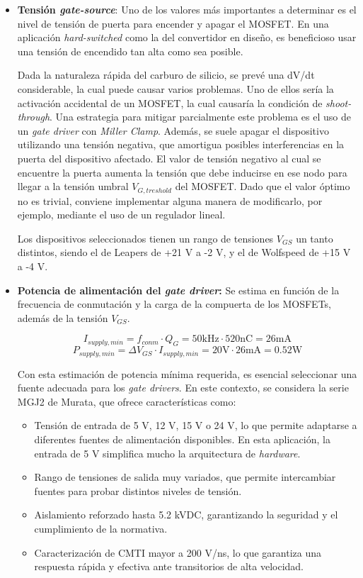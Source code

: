 \begin{itemize}
	
	\item \textbf{Tensión \textit{gate-source}}: Uno de los valores más importantes a determinar es el nivel de tensión de puerta para encender y apagar el MOSFET. En una aplicación \textit{hard-switched} como la del convertidor en diseño, es beneficioso usar una tensión de encendido tan alta como sea posible.
	
	Dada la naturaleza rápida del carburo de silicio, se prevé una dV/dt considerable, la cual puede causar varios problemas. Uno de ellos sería la activación accidental de un MOSFET, la cual causaría la condición de \textit{shoot-through}. Una estrategia para mitigar parcialmente este problema es el uso de un \textit{gate driver} con \textit{Miller Clamp}. Además, se suele apagar el dispositivo utilizando una tensión negativa, que amortigua posibles interferencias en la puerta del dispositivo afectado. El valor de tensión negativo al cual se encuentre la puerta aumenta la tensión que debe inducirse en ese nodo para llegar a la tensión umbral $V_{G,treshold}$ del MOSFET. Dado que el valor óptimo no es trivial, conviene implementar alguna manera de modificarlo, por ejemplo, mediante el uso de un regulador lineal.
	
	Los dispositivos seleccionados tienen un rango de tensiones $V_{GS}$ un tanto distintos, siendo el de Leapers de +21 V a -2 V, y el de Wolfspeed de +15 V a -4 V.
	
	\item \textbf{Potencia de alimentación del \textit{gate driver}:} Se estima en función de la frecuencia de conmutación y la carga de la compuerta de los MOSFETs, además de la tensión $V_{GS}$.
	
	\[
	I_{supply, min} = f_{conm}\cdot Q_G = 50 \text{kHz} \cdot 520 \text{nC} = 26 \text{mA}
	\]
	\[
	P_{supply, min} = \Delta V_{GS}\cdot I_{supply, min} = 20 \text{V} \cdot26 \text{mA} = 0.52 \text{W}
	\]
	
	Con esta estimación de potencia mínima requerida, es esencial seleccionar una fuente adecuada para los \textit{gate drivers}. En este contexto, se considera la serie MGJ2 de Murata, que ofrece características como:
	\begin{itemize}
		\item Tensión de entrada de 5 V, 12 V, 15 V o 24 V, lo que permite adaptarse a diferentes fuentes de alimentación disponibles. En esta aplicación, la entrada de 5 V simplifica mucho la arquitectura de \textit{hardware}.
		\item Rango de tensiones de salida muy variados, que permite intercambiar fuentes para probar distintos niveles de tensión.
		\item Aislamiento reforzado hasta 5.2 kVDC, garantizando la seguridad y el cumplimiento de la normativa.
		\item Caracterización de CMTI mayor a 200 V/ns, lo que garantiza una respuesta rápida y efectiva ante transitorios de alta velocidad.
	\end{itemize}
	

\end{itemize}
